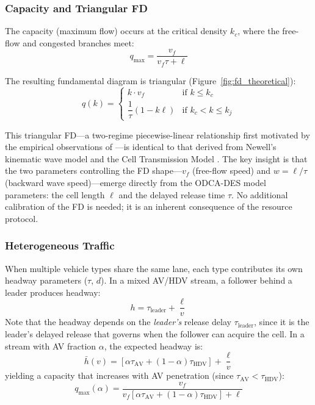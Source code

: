 \documentclass[review,authoryear]{elsarticle}
\begin{document}
\subsubsection{Capacity and Triangular FD}

The capacity (maximum flow) occurs at the critical density $k_c$, where the free-flow and congested branches meet:
\begin{equation}
    q_{\max} = \frac{v_f}{v_f \tau + \ell}
    \label{eq:capacity}
\end{equation}

The resulting fundamental diagram is triangular (Figure~\ref{fig:fd_theoretical}):
\begin{equation}
    q(k) = \begin{cases}
        k \cdot v_f & \text{if } k \leq k_c \\[4pt]
        \dfrac{1}{\tau}(1 - k\ell) & \text{if } k_c < k \leq k_j
    \end{cases}
    \label{eq:triangular_fd}
\end{equation}

This triangular FD---a two-regime piecewise-linear relationship first motivated by the empirical observations of \citet{greenshields1935study}---is identical to that derived from Newell's kinematic wave model \citep{newell1993simplified} and the Cell Transmission Model \citep{daganzo1994cell}. The key insight is that the two parameters controlling the FD shape---$v_f$ (free-flow speed) and $w = \ell/\tau$ (backward wave speed)---emerge directly from the ODCA-DES model parameters: the cell length $\ell$ and the delayed release time $\tau$. No additional calibration of the FD is needed; it is an inherent consequence of the resource protocol.

\subsubsection{Heterogeneous Traffic}

When multiple vehicle types share the same lane, each type contributes its own headway parameters ($\tau$, $d$). In a mixed AV/HDV stream, a follower behind a leader produces headway:
\begin{equation}
    h = \tau_{\text{leader}} + \frac{\ell}{v}
    \label{eq:mixed_headway}
\end{equation}
Note that the headway depends on the \emph{leader's} release delay $\tau_{\text{leader}}$, since it is the leader's delayed release that governs when the follower can acquire the cell. In a stream with AV fraction $\alpha$, the expected headway is:
\begin{equation}
    \bar{h}(v) = \left[\alpha \tau_{\text{AV}} + (1-\alpha)\tau_{\text{HDV}}\right] + \frac{\ell}{v}
    \label{eq:mixed_avg_headway}
\end{equation}
yielding a capacity that increases with AV penetration (since $\tau_{\text{AV}} < \tau_{\text{HDV}}$):
\begin{equation}
    q_{\max}(\alpha) = \frac{v_f}{v_f\left[\alpha \tau_{\text{AV}} + (1-\alpha)\tau_{\text{HDV}}\right] + \ell}
    \label{eq:mixed_capacity}
\end{equation}
\end{document}
